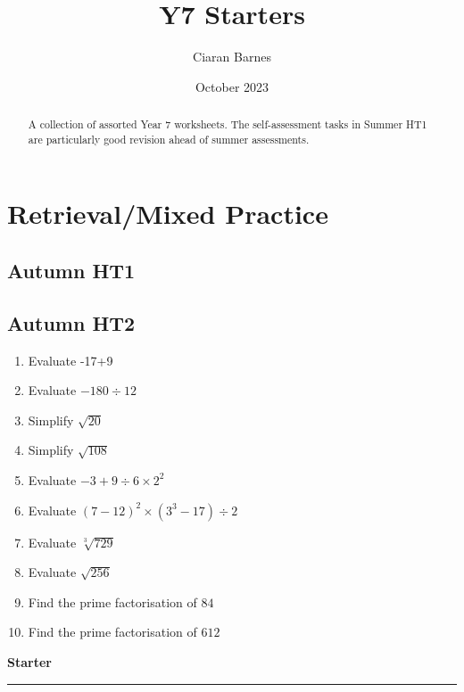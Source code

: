 \documentclass[12pt]{article}
\title{Y7 Starters}
\author{Ciaran Barnes}
\date{October 2023}
\begin{document}
\maketitle
\tableofcontents
\begin{abstract}
    A collection of assorted Year 7 worksheets. The self-assessment tasks in Summer HT1 are particularly good revision ahead of summer assessments.
\end{abstract}

\newpage

\section{Retrieval/Mixed Practice}

\subsection{Autumn HT1}

\newpage

\subsection{Autumn HT2}

\begin{enumerate}
    \item Evaluate -17+9
    \item Evaluate \(-180 \div 12\)
    \item Simplify \(\sqrt{20}\)
    \item Simplify \( \sqrt{108} \)
    \item Evaluate \(-3 + 9 \div 6 \times 2^2  \)
    \item Evaluate \((7-12)^2 \times (3^3-17) \div 2\)
    \item Evaluate \( \sqrt[3]{729}\)
    \item Evaluate \(\sqrt{256}\)
    \item Find the prime factorisation of \(84\)
    \item Find the prime factorisation of \(612\)
\end{enumerate}

\newpage

\noindent \textbf{Starter}

\medskip

\hrule 

\medskip
\end{document}
